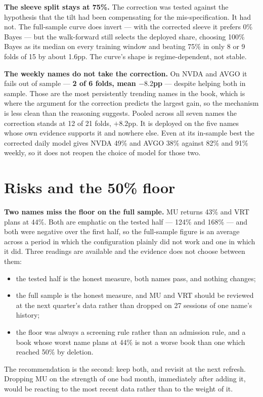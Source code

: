 \documentclass[11pt]{article}
\begin{document}
\textbf{The sleeve split stays at 75\%.} The correction was tested against the hypothesis that
the tilt had been compensating for the mis-specification. It had not. The full-sample curve does
invert --- with the corrected sleeve it prefers 0\% Bayes --- but the walk-forward still selects
the deployed share, choosing 100\% Bayes as its median on every training window and beating 75\%
in only 8 or 9 folds of 15 by about 1.6pp. The curve's shape is regime-dependent, not stable.

\textbf{The weekly names do not take the correction.} On NVDA and AVGO it fails out of sample ---
\textbf{2 of 6 folds, mean $-8.2$pp} --- despite helping both in sample. Those are the most
persistently trending names in the book, which is where the argument for the correction predicts
the largest gain, so the mechanism is less clean than the reasoning suggests. Pooled across all
seven names the correction stands at 12 of 21 folds, $+8.2$pp. It is deployed on the five names
whose own evidence supports it and nowhere else. Even at its in-sample best the corrected daily
model gives NVDA 49\% and AVGO 38\% against 82\% and 91\% weekly, so it does not reopen the
choice of model for those two.

\section{Risks and the 50\% floor}

\textbf{Two names miss the floor on the full sample.} MU returns 43\% and VRT plans at 44\%. Both
are emphatic on the tested half --- 124\% and 168\% --- and both were negative over the first
half, so the full-sample figure is an average across a period in which the configuration plainly
did not work and one in which it did. Three readings are available and the evidence does not
choose between them:
\begin{itemize}[leftmargin=1.4em,topsep=0.2em]
\item the tested half is the honest measure, both names pass, and nothing changes;
\item the full sample is the honest measure, and MU and VRT should be reviewed at the next
      quarter's data rather than dropped on 27 sessions of one name's history;
\item the floor was always a screening rule rather than an admission rule, and a book whose worst
      name plans at 44\% is not a worse book than one which reached 50\% by deletion.
\end{itemize}
The recommendation is the second: keep both, and revisit at the next refresh. Dropping MU on the
strength of one bad month, immediately after adding it, would be reacting to the most recent data
rather than to the weight of it.
\end{document}
